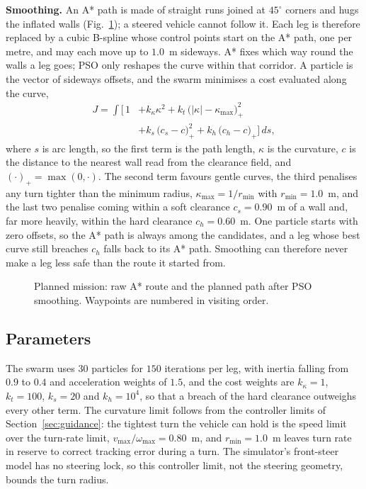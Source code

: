 \textbf{Smoothing.} An A* path is made of straight runs joined at
$45^{\circ}$ corners and hugs the inflated walls (Fig.~\ref{fig:plan});
a steered vehicle cannot follow it. Each leg is therefore replaced by
a cubic B-spline whose control points start on the A* path, one per
metre, and may each move up to $1.0$~m sideways. A* fixes which way
round the walls a leg goes; PSO \cite{shami2022} only reshapes the
curve within that corridor. A particle is the vector of sideways
offsets, and the swarm minimises a cost evaluated along the curve,
\begin{equation}
\begin{aligned}
    J = \int \Big[\, 1 &+ k_{\kappa}\kappa^{2}
      + k_{t}\,\big(|\kappa| - \kappa_{\max}\big)_{+}^{2} \\
      &+ k_{s}\,\big(c_{s} - c\big)_{+}^{2}
      + k_{h}\,\big(c_{h} - c\big)_{+} \Big]\, ds,
\end{aligned}
\label{eq:psocost}
\end{equation}
where $s$ is arc length, so the first term is the path length, $\kappa$
is the curvature, $c$ is the distance to the nearest wall read from the
clearance field, and $(\cdot)_{+} = \max(0,\cdot)$. The second term
favours gentle curves, the third penalises any turn tighter than the
minimum radius, $\kappa_{\max} = 1/r_{\min}$ with $r_{\min} = 1.0$~m,
and the last two penalise coming within a soft clearance
$c_{s} = 0.90$~m of a wall and, far more heavily, within the hard
clearance $c_{h} = 0.60$~m. One particle starts with zero
offsets, so the A* path is always among the candidates, and a leg whose
best curve still breaches $c_{h}$ falls back to its A* path. Smoothing
can therefore never make a leg less safe than the route it started from.

\begin{figure}[!t]
    \centering
    \caption{Planned mission: raw A* route and the planned path after PSO smoothing. Waypoints are
    numbered in visiting order.}
    \label{fig:plan}
\end{figure}

\subsection{Parameters}
The swarm uses $30$ particles for $150$ iterations per leg, with
inertia falling from $0.9$ to $0.4$ and acceleration weights of $1.5$,
and the cost weights are $k_{\kappa} = 1$, $k_{t} = 100$, $k_{s} = 20$
and $k_{h} = 10^{4}$, so that a breach of the hard clearance outweighs
every other term. The curvature limit follows from the controller limits of Section~\ref{sec:guidance}:
the tightest turn the vehicle can hold is the speed limit over the
turn-rate limit, $v_{\max}/\omega_{\max} = 0.80$~m, and $r_{\min} = 1.0$~m
leaves turn rate in reserve to correct tracking error during a turn.
The simulator's front-steer model has no steering lock, so this
controller limit, not the steering geometry, bounds the turn radius.


